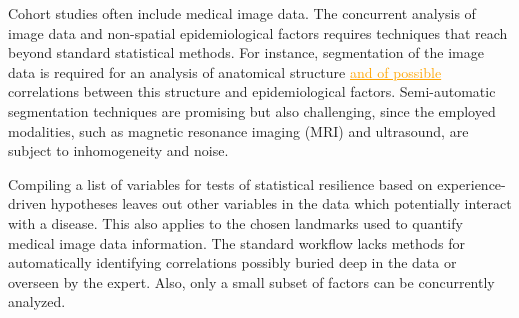 \documentclass[journal]{style/vgtc} 			          %
\newcommand{\com}[1]{\textcolor{orange}{\uline{#1}}}
\begin{document}
Cohort studies often include medical image data.
% 
The concurrent analysis of image data and non-spatial epidemiological factors requires techniques that reach beyond standard statistical methods.
%
For instance, segmentation of the image data is required for an analysis of anatomical structure \com{and of possible} correlations between this structure and epidemiological factors.
%
Semi-automatic segmentation techniques are promising but also challenging, since the employed modalities, such as magnetic resonance imaging (MRI) and ultrasound, are subject to inhomogeneity and noise.
%

Compiling a list of variables for tests of statistical resilience based on experience-driven hypotheses leaves out other variables in the data which potentially interact with a disease.
%
This also applies to the chosen landmarks used to quantify medical image data information.
%
%
The standard workflow lacks methods for automatically identifying correlations possibly buried deep in the data or overseen by the expert.
%
Also, only a small subset of factors can be concurrently analyzed.
%
\end{document}
